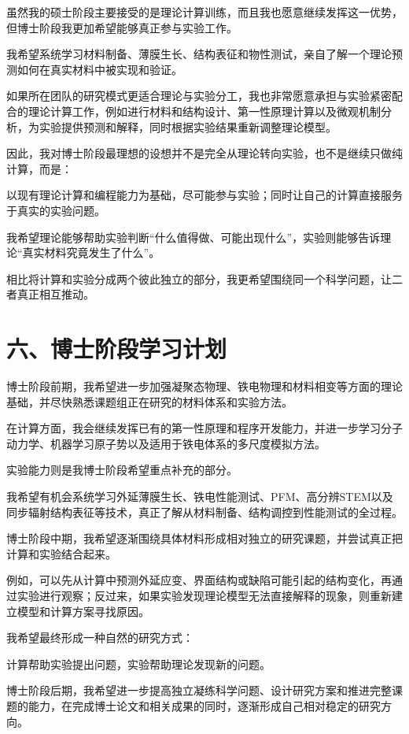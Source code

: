 虽然我的硕士阶段主要接受的是理论计算训练，而且我也愿意继续发挥这一优势，但博士阶段我更加希望能够真正参与实验工作。

我希望系统学习材料制备、薄膜生长、结构表征和物性测试，亲自了解一个理论预测如何在真实材料中被实现和验证。

如果所在团队的研究模式更适合理论与实验分工，我也非常愿意承担与实验紧密配合的理论计算工作，例如进行材料和结构设计、第一性原理计算以及微观机制分析，为实验提供预测和解释，同时根据实验结果重新调整理论模型。

因此，我对博士阶段最理想的设想并不是完全从理论转向实验，也不是继续只做纯计算，而是：

以现有理论计算和编程能力为基础，尽可能参与实验；同时让自己的计算直接服务于真实的实验问题。

我希望理论能够帮助实验判断“什么值得做、可能出现什么”，实验则能够告诉理论“真实材料究竟发生了什么”。

相比将计算和实验分成两个彼此独立的部分，我更希望围绕同一个科学问题，让二者真正相互推动。

\section{六、博士阶段学习计划}

博士阶段前期，我希望进一步加强凝聚态物理、铁电物理和材料相变等方面的理论基础，并尽快熟悉课题组正在研究的材料体系和实验方法。

在计算方面，我会继续发挥已有的第一性原理和程序开发能力，并进一步学习分子动力学、机器学习原子势以及适用于铁电体系的多尺度模拟方法。

实验能力则是我博士阶段希望重点补充的部分。

我希望有机会系统学习外延薄膜生长、铁电性能测试、PFM、高分辨STEM以及同步辐射结构表征等技术，真正了解从材料制备、结构调控到性能测试的全过程。

博士阶段中期，我希望逐渐围绕具体材料形成相对独立的研究课题，并尝试真正把计算和实验结合起来。

例如，可以先从计算中预测外延应变、界面结构或缺陷可能引起的结构变化，再通过实验进行观察；反过来，如果实验发现理论模型无法直接解释的现象，则重新建立模型和计算方案寻找原因。

我希望最终形成一种自然的研究方式：

计算帮助实验提出问题，实验帮助理论发现新的问题。

博士阶段后期，我希望进一步提高独立凝练科学问题、设计研究方案和推进完整课题的能力，在完成博士论文和相关成果的同时，逐渐形成自己相对稳定的研究方向。

